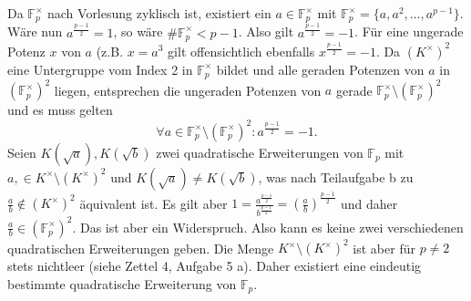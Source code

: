 \documentclass{article}
\begin{document}
\begin{enumerate}[(a)]
        Da $\mathbb{F}_p^\times$ nach Vorlesung zyklisch ist, existiert ein $a\in \mathbb{F}_p^\times$ mit $\mathbb{F}_p^\times = \{a, a^2, \dots, a^{p-1}\}$. Wäre nun $a^{\frac{p-1}{2}} = 1$, so wäre $\# \mathbb{F}_p^\times < p-1$. Also gilt $a^{\frac{p-1}{2}} = -1$. Für eine ungerade Potenz $x$ von $a$ (z.B. $x = a^3$ gilt offensichtlich ebenfalls $x^{\frac{p-1}{2}} = -1$. Da $(K^\times)^2$ eine Untergruppe vom Index 2 in $\mathbb{F}_p^\times$ bildet und alle geraden Potenzen von $a$ in $(\mathbb{F}_p^\times)^2$ liegen, entsprechen die ungeraden Potenzen von $a$ gerade $\mathbb{F}_p^\times\setminus (\mathbb{F}_p^\times)^2$ und es muss gelten
        \[
            \forall a \in \mathbb{F}_p^\times\setminus (\mathbb{F}_p^\times)^2\colon a^{\frac{p-1}{2}} = -1.  
        \]
        Seien $K(\sqrt{a}), K(\sqrt{b})$ zwei quadratische Erweiterungen von $\mathbb{F}_p$ mit $a,  \in K^\times \setminus (K^\times)^2$ und $K(\sqrt{a}) \neq K(\sqrt{b})$, was nach Teilaufgabe b zu $\frac{a}{b} \notin (K^\times)^2$ äquivalent ist. Es gilt aber $1 = \frac{a^{\frac{p-1}{2}}}{b^{\frac{p-1}{2}}} = \left(\frac{a}{b}\right)^{\frac{p-1}{2}}$ und daher $\frac{a}{b} \in (\mathbb{F}_p^\times)^2$. Das ist aber ein Widerspruch. Also kann es keine zwei verschiedenen quadratischen Erweiterungen geben. Die Menge $K^\times \setminus (K^\times)^2$ ist aber für $p \neq 2$ stets nichtleer (siehe Zettel 4, Aufgabe 5 a).
        Daher existiert eine eindeutig bestimmte quadratische Erweiterung von $\mathbb{F}_p$.
    \end{enumerate}
\end{document}
